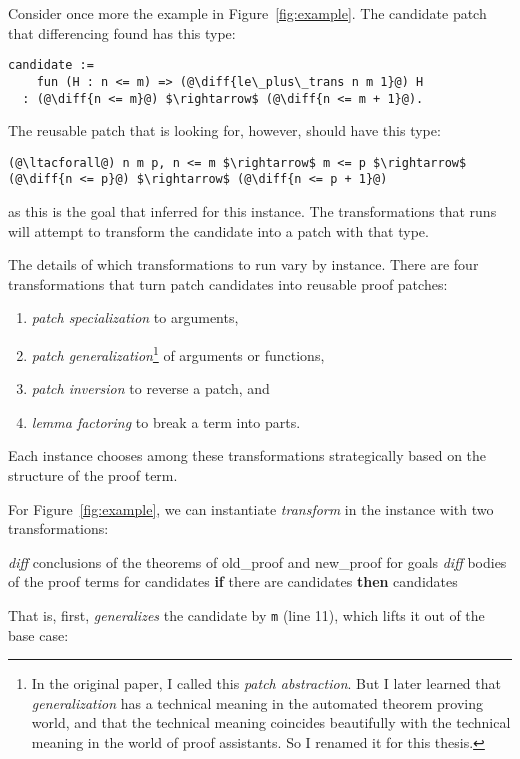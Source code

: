 Consider once more the example in Figure~\ref{fig:example}.
The candidate patch that differencing found has this type:

\begin{lstlisting}[language=coq]
  candidate :=
    fun (H : n <= m) => (@\diff{le\_plus\_trans n m 1}@) H
  : (@\diff{n <= m}@) $\rightarrow$ (@\diff{n <= m + 1}@).
\end{lstlisting}
The reusable patch that \sysname is looking for, however, should have this type:

\begin{lstlisting}[language=coq]
  (@\ltacforall@) n m p, n <= m $\rightarrow$ m <= p $\rightarrow$ (@\diff{n <= p}@) $\rightarrow$ (@\diff{n <= p + 1}@)
\end{lstlisting}
as this is the goal that \sysname inferred for this instance.
The transformations that \sysname runs will attempt to transform the candidate
into a patch with that type.

The details of which transformations to run vary by instance.
There are four transformations that turn patch candidates into reusable proof patches:

\begin{enumerate}
\item \textit{patch specialization} to arguments,
\item \textit{patch generalization}\footnote{In the original paper, I called this \textit{patch abstraction}. But I later learned that \textit{generalization} has a technical meaning in the automated theorem proving world, and that the technical meaning coincides beautifully with the technical meaning in the world of proof assistants. So I renamed it for this thesis.} of arguments or functions,
\item \textit{patch inversion} to reverse a patch, and
\item \textit{lemma factoring} to break a term into parts.
\end{enumerate}
Each instance chooses among these transformations strategically based on the structure of the proof term.

For Figure~\ref{fig:example}, we can instantiate \textit{transform} in the instance with two transformations:

\begin{algorithm}
\footnotesize
\begin{algorithmic}[1]
    \STATE \textit{diff} conclusions of the theorems of old\_proof and new\_proof for goals
    \STATE \textit{diff} bodies of the proof terms for candidates
    \STATE \textbf{if} there are candidates \textbf{then}
    \STATE \hspace*{1em}  candidates
\end{algorithmic}
\end{algorithm}
That is, first, \sysname \textit{generalizes} the candidate by \lstinline{m} (line 11), which lifts it out of the base case:

